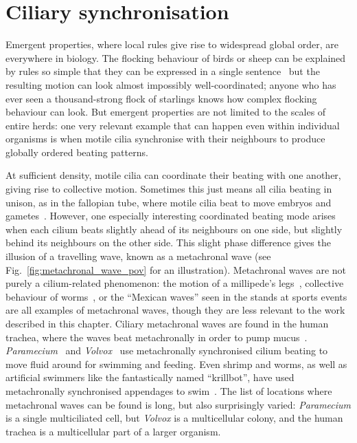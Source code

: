 \setchapterpreamble[u]{\optmargintoc}
\chapter{Ciliary synchronisation}

Emergent properties, where local rules give rise to widespread global order, are everywhere in biology. The flocking behaviour of birds or sheep can be explained by rules so simple that they can be expressed in a single sentence~ but the resulting motion can look almost impossibly well-coordinated; anyone who has ever seen a thousand-strong flock of starlings knows how complex flocking behaviour can look. But emergent properties are not limited to the scales of entire herds: one very relevant example that can happen even within individual organisms is when motile cilia synchronise with their neighbours to produce globally ordered beating patterns.

At sufficient density, motile cilia can coordinate their beating with one another, giving rise to collective motion. Sometimes this just means all cilia beating in unison, as in the fallopian tube, where motile cilia beat to move embryos and gametes~. However, one especially interesting coordinated beating mode arises when each cilium beats slightly ahead of its neighbours on one side, but slightly behind its neighbours on the other side. This slight phase difference gives the illusion of a travelling wave, known as a metachronal wave (see Fig.~\ref{fig:metachronal_wave_pov} for an illustration). Metachronal waves are not purely a cilium-related phenomenon: the motion of a millipede's legs~, collective behaviour of worms~, or the ``Mexican waves'' seen in the stands at sports events are all examples of metachronal waves, though they are less relevant to the work described in this chapter. Ciliary metachronal waves are found in the human trachea, where the waves beat metachronally in order to pump mucus~. \textit{Paramecium}~ and \textit{Volvox}~ use metachronally synchronised cilium beating to move fluid around for swimming and feeding. Even shrimp and worms, as well as artificial swimmers like the fantastically named ``krillbot'', have used metachronally synchronised appendages to swim~. The list of locations where metachronal waves can be found is long, but also surprisingly varied: \textit{Paramecium} is a single multiciliated cell, but \textit{Volvox} is a multicellular colony, and the human trachea is a multicellular part of a larger organism.

